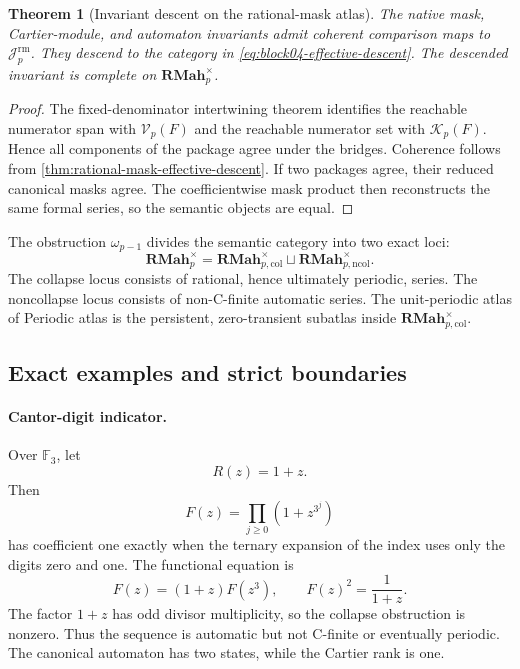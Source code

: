 \documentclass[11pt]{article}
\newtheorem{theorem}{Theorem}[section]
\theoremstyle{definition}
\theoremstyle{remark}
\newcommand{\RMah}{\mathbf{RMah}}
\begin{document}
\begin{theorem}[Invariant descent on the rational-mask atlas]
\label{thm:rational-mask-invariant-descent}
The native mask, Cartier-module, and automaton invariants admit coherent comparison maps to \(\mathcal J_p^{\mathrm{rm}}\).  They descend to the category in \cref{eq:block04-effective-descent}.  The descended invariant is complete on \(\RMah_p^{\times}\).
\end{theorem}

\begin{proof}
The fixed-denominator intertwining theorem identifies the reachable numerator span with \(\mathcal V_p(F)\) and the reachable numerator set with \(\mathcal K_p(F)\).  Hence all components of the package agree under the bridges.  Coherence follows from \cref{thm:rational-mask-effective-descent}.  If two packages agree, their reduced canonical masks agree.  The coefficientwise mask product then reconstructs the same formal series, so the semantic objects are equal.
\end{proof}

The obstruction \(\omega_{p-1}\) divides the semantic category into two exact loci:
\[
\RMah_p^{\times}
=
\RMah_{p,\mathrm{col}}^{\times}
\sqcup
\RMah_{p,\mathrm{ncol}}^{\times}.
\]
The collapse locus consists of rational, hence ultimately periodic, series.  The noncollapse locus consists of non-C-finite automatic series.  The unit-periodic atlas of Periodic atlas is the persistent, zero-transient subatlas inside \(\RMah_{p,\mathrm{col}}^{\times}\).

\subsection{Exact examples and strict boundaries}



\paragraph{Cantor-digit indicator.}
Over \(\mathbb F_3\), let
\[
R(z)=1+z.
\]
Then
\[
F(z)=\prod_{j\geq0}(1+z^{3^j})
\]
has coefficient one exactly when the ternary expansion of the index uses only the digits zero and one.  The functional equation is
\[
F(z)=(1+z)F(z^3),
\qquad
F(z)^2=\frac1{1+z}.
\]
The factor \(1+z\) has odd divisor multiplicity, so the collapse obstruction is nonzero.  Thus the sequence is automatic but not C-finite or eventually periodic.  The canonical automaton has two states, while the Cartier rank is one.
\end{document}
